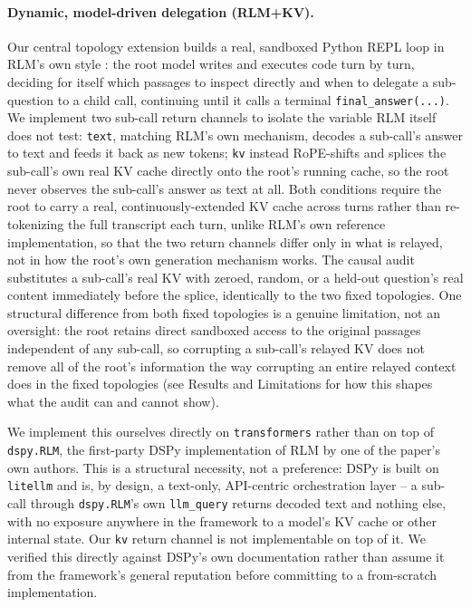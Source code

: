 \documentclass[11pt]{article}
\begin{document}
\paragraph{Dynamic, model-driven delegation (RLM+KV).} Our central
topology extension builds a real, sandboxed Python REPL loop in RLM's
own style \citep{rlm2026}: the root model writes and executes code
turn by turn, deciding for itself which passages to inspect directly and
when to delegate a sub-question to a child call, continuing until it
calls a terminal \texttt{final\_answer(...)}. We implement two
sub-call return channels to isolate the variable RLM itself does not
test: \texttt{text}, matching RLM's own mechanism, decodes a sub-call's
answer to text and feeds it back as new tokens; \texttt{kv} instead
RoPE-shifts and splices the sub-call's own real KV cache directly onto
the root's running cache, so the root never observes the sub-call's
answer as text at all. Both conditions require the root to carry a
real, continuously-extended KV cache across turns rather than
re-tokenizing the full transcript each turn, unlike RLM's own reference
implementation, so that the two return channels differ only in what is
relayed, not in how the root's own generation mechanism works. The
causal audit substitutes a sub-call's real KV with zeroed, random, or a
held-out question's real content immediately before the splice,
identically to the two fixed topologies. One structural difference from
both fixed topologies is a genuine limitation, not an oversight: the
root retains direct sandboxed access to the original passages
independent of any sub-call, so corrupting a sub-call's relayed KV does
not remove all of the root's information the way corrupting an entire
relayed context does in the fixed topologies (see Results and
Limitations for how this shapes what the audit can and cannot show).

We implement this ourselves directly on \texttt{transformers}
\citep{transformers2020} rather than on top of \texttt{dspy.RLM}, the
first-party DSPy implementation of RLM by one of the paper's own
authors. This is a structural necessity, not a preference: DSPy is
built on \texttt{litellm} and is, by design, a text-only, API-centric
orchestration layer -- a sub-call through \texttt{dspy.RLM}'s own
\texttt{llm\_query} returns decoded text and nothing else, with no
exposure anywhere in the framework to a model's KV cache or other
internal state. Our \texttt{kv} return channel is not implementable on
top of it. We verified this directly against DSPy's own documentation
rather than assume it from the framework's general reputation before
committing to a from-scratch implementation.
\end{document}
